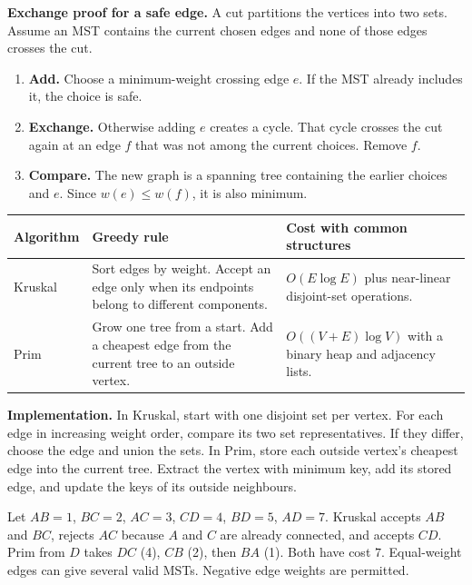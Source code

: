 \documentclass[12pt,a4paper]{article}
\begin{document}
\textbf{Exchange proof for a safe edge.} A cut partitions the vertices into two sets. Assume an MST contains the current chosen edges and none of those edges crosses the cut.
\begin{enumerate}[leftmargin=*, itemsep=2pt]
  \item \textbf{Add.} Choose a minimum-weight crossing edge $e$. If the MST already includes it, the choice is safe.
  \item \textbf{Exchange.} Otherwise adding $e$ creates a cycle. That cycle crosses the cut again at an edge $f$ that was not among the current choices. Remove $f$.
  \item \textbf{Compare.} The new graph is a spanning tree containing the earlier choices and $e$. Since $w(e)\le w(f)$, it is also minimum.
\end{enumerate}
\par\vspace{5pt}
\begingroup
\setlength{\extrarowheight}{1pt}
\noindent\begin{tabularx}{\linewidth}{|B{3.0cm}|Y|Y|}
\hline
\textbf{Algorithm} & \textbf{Greedy rule} & \textbf{Cost with common structures} \\ \hline
Kruskal & Sort edges by weight. Accept an edge only when its endpoints belong to different components. & $O(E\log E)$ plus near-linear disjoint-set operations. \\ \hline
Prim & Grow one tree from a start. Add a cheapest edge from the current tree to an outside vertex. & $O((V+E)\log V)$ with a binary heap and adjacency lists. \\ \hline
\end{tabularx}\par
\endgroup
\textbf{Implementation.} In Kruskal, start with one disjoint set per vertex. For each edge in increasing weight order, compare its two set representatives. If they differ, choose the edge and union the sets. In Prim, store each outside vertex's cheapest edge into the current tree. Extract the vertex with minimum key, add its stored edge, and update the keys of its outside neighbours.

\begin{tcolorbox}[examplebox, title={Kruskal and Prim on the same network}]
Let $AB=1$, $BC=2$, $AC=3$, $CD=4$, $BD=5$, $AD=7$. Kruskal accepts $AB$ and $BC$, rejects $AC$ because $A$ and $C$ are already connected, and accepts $CD$. Prim from $D$ takes $DC$ (4), $CB$ (2), then $BA$ (1). Both have cost $7$. Equal-weight edges can give several valid MSTs. Negative edge weights are permitted.
\end{tcolorbox}
\end{document}
